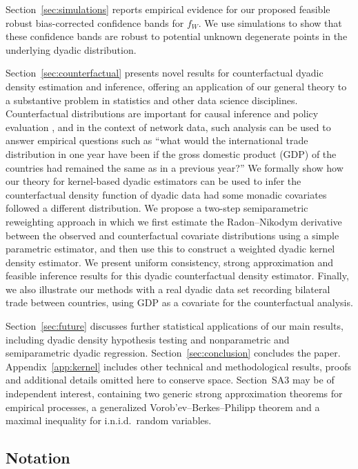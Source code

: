 Section~\ref{sec:simulations} reports
empirical evidence for our proposed
feasible robust bias-corrected confidence bands for $f_W$.
We use simulations to show that these confidence bands are robust to potential
unknown degenerate points in the underlying dyadic distribution.

Section~\ref{sec:counterfactual} presents novel results for counterfactual
dyadic density estimation and inference,
offering an application of our general theory to a
substantive problem in statistics and other data science disciplines.
Counterfactual distributions are important for causal inference
and policy evaluation
\citep{dinardo1996distribution,chernozhukov2013inference},
and in the context of network data,
such analysis can be used to answer empirical questions
such as ``what would the international trade distribution in one year have been
if the gross domestic product (GDP) of the countries had
remained the same as in a previous year?''
We formally show how our theory for kernel-based dyadic estimators
can be used
to infer the counterfactual density function
of dyadic data had some monadic covariates followed a
different distribution.
We propose a two-step semiparametric reweighting approach in which we
first estimate the Radon--Nikodym derivative between the
observed and counterfactual
covariate distributions using a simple parametric estimator,
and then use this to construct a weighted dyadic kernel density estimator.
We present uniform consistency, strong approximation
and feasible inference results
for this dyadic counterfactual density estimator.
Finally, we also illustrate our methods
with a real dyadic data set recording bilateral trade between countries,
using GDP as a covariate for the counterfactual analysis.

Section~\ref{sec:future} discusses further statistical
applications of our main results,
including dyadic density hypothesis testing and nonparametric
and semiparametric dyadic regression.
Section~\ref{sec:conclusion} concludes the paper.
Appendix~\ref{app:kernel}
includes other technical and methodological
results, proofs and additional details omitted here to conserve space.
Section~SA3 may be of independent interest, containing
two generic strong approximation theorems for empirical processes,
a generalized Vorob'ev--Berkes--Philipp theorem
and a maximal inequality for i.n.i.d.\ random variables.

\subsection{Notation}

